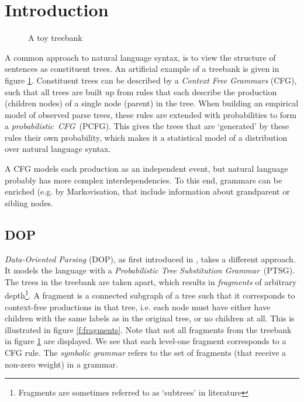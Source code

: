 
\section{Introduction}




\begin{figure}[h!]
\center 
\caption{A toy treebank} \label{f:treebank}
\end{figure}

A common approach to natural language syntax, is to view the structure of sentences as constituent trees. An artificial example of a treebank is given in figure \ref{f:treebank}. Constituent trees can be described by a \emph{Context Free Grammars} (CFG),  such that all trees are built up from  rules that each describe the production (children nodes) of a single node (parent) in the tree. When building an empirical model of observed parse trees, these rules are extended with probabilities to form a \emph{probabilistic~CFG}~(PCFG). This gives the trees that are `generated' by these rules their own probability, which makes it a statistical model of a distribution over natural language syntax.

A CFG models each production as an independent event, but natural language probably has more complex interdependencies. To this end, grammars can be enriched (e.g. by Markovisation, that include information about grandparent or sibling nodes.


\subsection{DOP}
\emph{Data-Oriented Parsing} (DOP), as first introduced in \cite{scha1990}, takes a different approach. It models the language with a \emph{Probabilistic Tree Substitution Grammar}~(PTSG). 
The trees in the treebank are taken apart, which results in \emph{fragments} of arbitrary depth\footnote{Fragments are sometimes referred to as `subtrees' in literature}.
A fragment is a connected subgraph of a tree such that it corresponds to context-free productions in that tree, i.e. each node must have either have children with the same labels as in the original tree, or no children at all. This is illustrated in figure \ref{f:fragments}. Note that not all fragments from the treebank in figure \ref{f:treebank} are displayed. We see that each level-one fragment corresponds to a CFG rule. The \emph{symbolic grammar} refers to the set of fragments (that receive a non-zero weight) in a grammar. 



